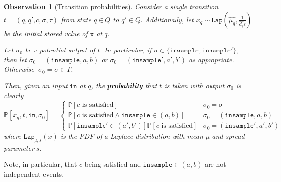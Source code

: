 \documentclass[12pt]{article}
\newcommand{\PP}{\mathbb{P}}
\newcommand{\Lap}{\texttt{Lap}}
\newtheorem{obs}[thm]{Observation}
\theoremstyle{definition}
\begin{document}
\begin{obs}[Transition probabilities]
    Consider a single transition $t=(q, q', c, \sigma, \tau)$ from state $q\in Q$ to $q'\in Q$. Additionally, let $x_q\sim \Lap(\hat{\mu_q}, \frac{1}{\hat{d_q}\varepsilon})$ be the initial stored value of $\texttt{x}$ at $q$. 

    Let $\sigma_0$ be a \textit{potential} output of $t$. In particular, if $\sigma\in \{\texttt{insample}, \texttt{insample}'\}$, then let $\sigma_0 = (\texttt{insample}, a, b)$ or $\sigma_0 = (\texttt{insample}', a', b')$ as appropriate. Otherwise, $\sigma_0 = \sigma\in \Gamma$. 
    
    Then, given an input $\texttt{in}$ at $q$, the \textbf{probability} that $t$ is taken with output $\sigma_0$ is clearly \[
        \PP[x_q, t, \texttt{in}, \sigma_0] = \begin{cases}
            \PP[c\text{ is satisfied}] & \sigma_0 =\sigma \\
            \PP[c\text{ is satisfied}\land \texttt{insample}\in(a, b)] & \sigma_0 = (\texttt{insample}, a, b)\\
            \PP[\texttt{insample}'\in (a', b')]\PP[c\text{ is satisfied}]& \sigma_0 = (\texttt{insample}', a', b')
        \end{cases}
    \]
    where $\Lap_{\mu, s}(x)$ is the PDF of a Laplace distribution with mean $\mu$ and spread parameter $s$.
\end{obs}

Note, in particular, that $c$ being satisfied and $\texttt{insample}\in (a, b)$ are not independent events.
\end{document}
